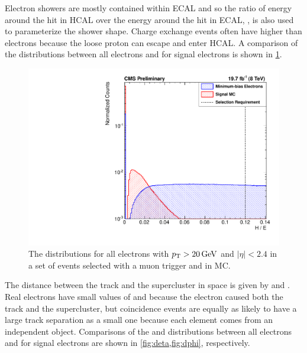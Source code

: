 Electron showers are mostly contained within ECAL and so the ratio of energy
around the hit in HCAL over the energy around the hit in ECAL, \HOverE, is also
used to parameterize the shower shape. Charge exchange events often have higher
\HOverE than electrons because the loose proton can escape and enter HCAL. A
comparison of the \HOverE distributions between all electrons and for signal
electrons is shown in \cref{fig:he}.

\begin{figure}[!htbp]
    \centering
    \includegraphics[width=\StackedPlotWidth]{figures/e_reco_var_he.pdf}
    \caption[
        Distributions of \HOverE in data and MC.
    ]{
        The \HOverE distributions for all electrons with $p_{\mathrm{T}} > 20 \,\text{Ge\hspace{-.08em}V}$ and
        $|\eta| < 2.4$ in a set of events selected with a muon trigger and in
        \MADGRAPH \Ztoee MC.
    }
    \label{fig:he}
\end{figure}

The distance between the track and the supercluster in \coordetaphi space is
given by \dphiin and \detain. Real electrons have small values of \dphiin and
\detain because the electron caused both the track and the supercluster, but
coincidence events are equally as likely to have a large track separation as a
small one because each element comes from an independent object. Comparisons of
the \dphiin and \detain distributions between all electrons and for signal
electrons are shown in \cref{fig:deta,fig:dphi}, respectively.


